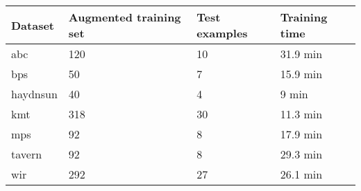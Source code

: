 \begin{tabular}{l|lll}
Dataset        & Augmented training set & Test examples & Training time \\ \hline
\gls{abc}      & 120                    & 10            & 31.9 min      \\
\gls{bps}      & 50                     & 7             & 15.9 min      \\
\gls{haydnsun} & 40                     & 4             & 9 min         \\
\gls{kmt}      & 318                    & 30            & 11.3 min      \\
\gls{mps}      & 92                     & 8             & 17.9 min      \\
\gls{tavern}   & 92                     & 8             & 29.3 min      \\
\gls{wir}      & 292                    & 27            & 26.1 min     
\end{tabular}
